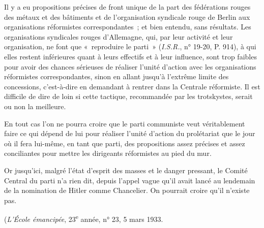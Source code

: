 \documentclass[french,twoside]{book} %
\begin{document}
Il y a eu propositions précises de front unique de la part des fédérations rouges des métaux et des bâtiments et de l'organisation syndicale rouge de Berlin aux organisations réformistes correspondantes ; et bien entendu, sans résultats. Les organisations syndicales rouges d'Allemagne, qui, par leur activité et leur organisation, ne font que « reproduire le parti » ({\itshape I.S.R.}, n° 19-20, P. 914), à qui elles restent inférieures quant à leurs effectifs et à leur influence, sont trop faibles pour avoir des chances sérieuses de réaliser l'unité d'action avec les organisations réformistes correspondantes, sinon en allant jusqu'à l'extrême limite des concessions, c'est-à-dire en demandant à rentrer dans la Centrale réformiste. Il est difficile de dire de loin si cette tactique, recommandée par les trotskystes, serait ou non la meilleure.\par
En tout cas l'on ne pourra croire que le parti communiste veut véritable­ment faire ce qui dépend de lui pour réaliser l'unité d'action du prolétariat que le jour où il fera lui-même, en tant que parti, des propositions assez précises et assez conciliantes pour mettre les dirigeants réformistes au pied du mur.\par
Or jusqu'ici, malgré l'état d'esprit des masses et le danger pressant, le Comité Central du parti n'a rien dit, depuis l'appel vague qu'il avait lancé au lendemain de la nomination de Hitler comme Chancelier. On pourrait croire qu'il n'existe pas.\par
({\itshape L'École émancipée}, 23\textsuperscript{e} année, n° 23, 5 mars 1933.\par

\begin{center}
\noindent \centerline{}
\end{center}
\end{document}
